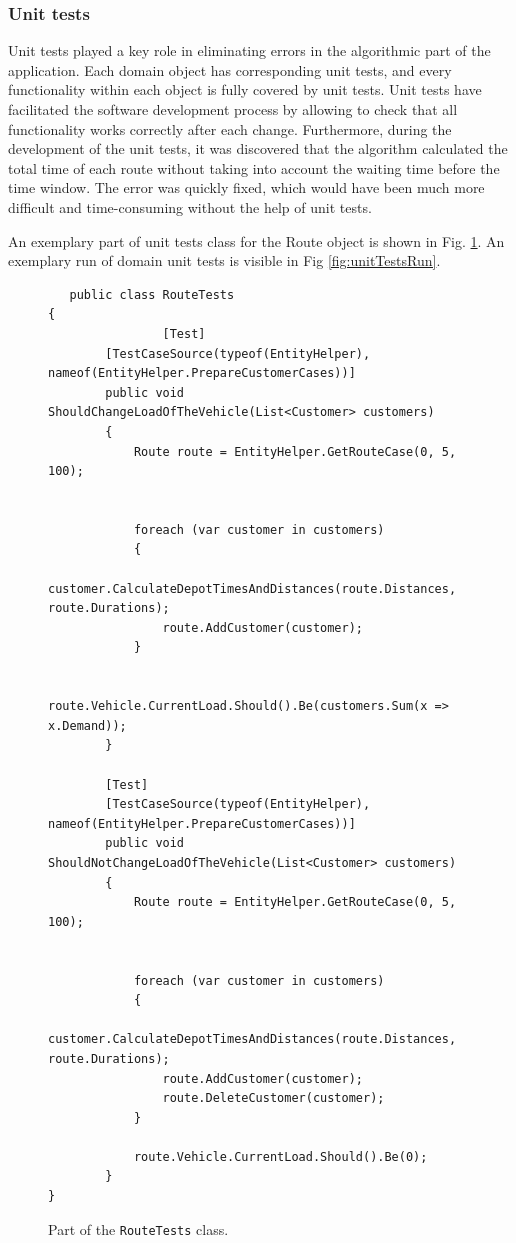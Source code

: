 \documentclass[a4paper,twoside,12pt]{book}
\begin{document}
\subsubsection{Unit tests}
Unit tests played a key role in eliminating errors in the algorithmic part of the application. Each domain object has corresponding unit tests, and every functionality within each object is fully covered by unit tests. Unit tests have facilitated the software development process by allowing to check that all functionality works correctly after each change. Furthermore, during the development of the unit tests, it was discovered that the algorithm calculated the total time of each route without taking into account the waiting time before the time window. The error was quickly fixed, which would have been much more difficult and time-consuming without the help of unit tests.

An exemplary part of unit tests class for the Route object is shown in Fig. \ref{fig:routeUnitTests}.
An exemplary run of domain unit tests is visible in Fig \ref{fig:unitTestsRun}.

\begin{figure}
\centering
\begin{lstlisting}
   public class RouteTests
{
                [Test]
        [TestCaseSource(typeof(EntityHelper), nameof(EntityHelper.PrepareCustomerCases))]
        public void ShouldChangeLoadOfTheVehicle(List<Customer> customers)
        {
            Route route = EntityHelper.GetRouteCase(0, 5, 100);


            foreach (var customer in customers)
            {
                customer.CalculateDepotTimesAndDistances(route.Distances, route.Durations);
                route.AddCustomer(customer);
            }

            route.Vehicle.CurrentLoad.Should().Be(customers.Sum(x => x.Demand));
        }

        [Test]
        [TestCaseSource(typeof(EntityHelper), nameof(EntityHelper.PrepareCustomerCases))]
        public void ShouldNotChangeLoadOfTheVehicle(List<Customer> customers)
        {
            Route route = EntityHelper.GetRouteCase(0, 5, 100);


            foreach (var customer in customers)
            {
                customer.CalculateDepotTimesAndDistances(route.Distances, route.Durations);
                route.AddCustomer(customer);
                route.DeleteCustomer(customer);
            }

            route.Vehicle.CurrentLoad.Should().Be(0);
        }
}

\end{lstlisting}
\caption{Part of the \lstinline|RouteTests| class.}
\label{fig:routeUnitTests}
\end{figure}
\end{document}

